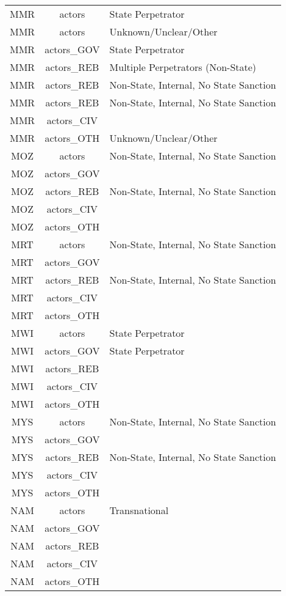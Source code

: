 \documentclass[12pt]{article}
\begin{document}
\begin{center}
\begin{longtable}{|c|c|p{10cm}|}
  MMR & actors & State Perpetrator \\ 
  MMR & actors & Unknown/Unclear/Other \\ 
  MMR & actors\_GOV & State Perpetrator \\ 
  MMR & actors\_REB & Multiple Perpetrators (Non-State) \\ 
  MMR & actors\_REB & Non-State, Internal, No State Sanction \\ 
  MMR & actors\_REB & Non-State, Internal, No State Sanction \\ 
  MMR & actors\_CIV &  \\ 
  MMR & actors\_OTH & Unknown/Unclear/Other \\ 
  MOZ & actors & Non-State, Internal, No State Sanction \\ 
  MOZ & actors\_GOV &  \\ 
  MOZ & actors\_REB & Non-State, Internal, No State Sanction \\ 
  MOZ & actors\_CIV &  \\ 
  MOZ & actors\_OTH &  \\ 
  MRT & actors & Non-State, Internal, No State Sanction \\ 
  MRT & actors\_GOV &  \\ 
  MRT & actors\_REB & Non-State, Internal, No State Sanction \\ 
  MRT & actors\_CIV &  \\ 
  MRT & actors\_OTH &  \\ 
  MWI & actors & State Perpetrator \\ 
  MWI & actors\_GOV & State Perpetrator \\ 
  MWI & actors\_REB &  \\ 
  MWI & actors\_CIV &  \\ 
  MWI & actors\_OTH &  \\ 
  MYS & actors & Non-State, Internal, No State Sanction \\ 
  MYS & actors\_GOV &  \\ 
  MYS & actors\_REB & Non-State, Internal, No State Sanction \\ 
  MYS & actors\_CIV &  \\ 
  MYS & actors\_OTH &  \\ 
  NAM & actors & Transnational \\ 
  NAM & actors\_GOV &  \\ 
  NAM & actors\_REB &  \\ 
  NAM & actors\_CIV &  \\ 
  NAM & actors\_OTH &  \\ 

\end{longtable}
\end{center}
\end{document}

